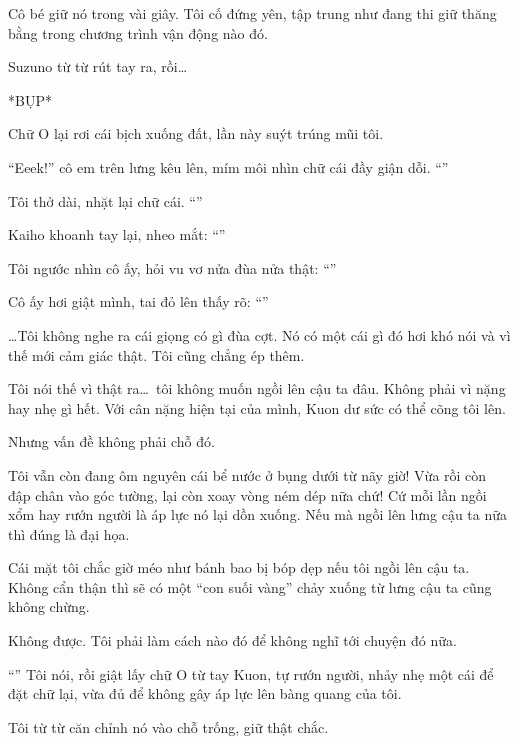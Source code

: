 \documentclass[../main.tex]{subfiles}
\begin{document}
Cô bé giữ nó trong vài giây. Tôi cố đứng yên, tập trung như đang thi giữ thăng bằng trong chương trình vận động nào đó.

Suzuno từ từ rút tay ra, rồi\dots

*BỤP*

Chữ O lại rơi cái bịch xuống đất, lần này suýt trúng mũi tôi.

``Eeek!'' cô em trên lưng kêu lên, mím môi nhìn chữ cái đầy giận dỗi. ``''

Tôi thở dài, nhặt lại chữ cái. ``''

Kaiho khoanh tay lại, nheo mắt: ``''

Tôi ngước nhìn cô ấy, hỏi vu vơ nửa đùa nửa thật: ``''

Cô ấy hơi giật mình, tai đỏ lên thấy rõ: ``''

\dots Tôi không nghe ra cái giọng có gì đùa cợt. Nó có một cái gì đó hơi khó nói và vì thế mới cảm giác thật. Tôi cũng chẳng ép thêm.


\il

Tôi nói thế vì thật ra\dots\ tôi không muốn ngồi lên cậu ta đâu. Không phải vì nặng hay nhẹ gì hết. Với cân nặng hiện tại của mình, Kuon dư sức có thể cõng tôi lên.

Nhưng vấn đề không phải chỗ đó.

Tôi vẫn còn đang ôm nguyên cái bể nước ở bụng dưới từ nãy giờ! Vừa rồi còn đập chân vào góc tường, lại còn xoay vòng ném dép nữa chứ! Cứ mỗi lần ngồi xổm hay rướn người là áp lực nó lại dồn xuống. Nếu mà ngồi lên lưng cậu ta nữa thì đúng là đại họa.

Cái mặt tôi chắc giờ méo như bánh bao bị bóp dẹp nếu tôi ngồi lên cậu ta. Không cẩn thận thì sẽ có một ``con suối vàng'' chảy xuống từ lưng cậu ta cũng không chừng.

Không được. Tôi phải làm cách nào đó để không nghĩ tới chuyện đó nữa.

\il

``'' Tôi nói, rồi giật lấy chữ O từ tay Kuon, tự rướn người, nhảy nhẹ một cái để đặt chữ lại, vừa đủ để không gây áp lực lên bàng quang của tôi.

Tôi từ từ căn chỉnh nó vào chỗ trống, giữ thật chắc.
\end{document}
